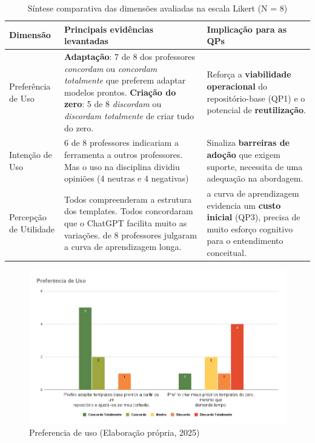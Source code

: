 \begin{table}[H]
    \centering
    \caption{Síntese comparativa das dimensões avaliadas na escala Likert (N = 8)}
    \label{tab:dimensoes-likert}
    \begin{tabular}{|p{} |p{} |p{}|}
        \hline
        \textbf{Dimensão} & \textbf{Principais evidências levantadas} & \textbf{Implicação para as QPs}\\ \hline
        Preferência de Uso &
             \textbf{Adaptação}: 7 de 8 dos professores \textit{concordam} ou \textit{concordam totalmente} que preferem adaptar modelos prontos. \newline%
             \textbf{Criação do zero}: 5 de 8 \textit{discordam} ou \textit{discordam totalmente} de criar tudo do zero.%
         &
        Reforça a \textbf{viabilidade operacional} do repositório-base (QP1) e o potencial de \textbf{reutilização}. \\ \hline
        Intenção de Uso &
            6 de 8 professores indicariam a ferramenta a outros professores. Mas o uso na disciplina dividiu opiniões (4 neutras e 4 negativas)%
        \ &
        Sinaliza \textbf{barreiras de adoção} que exigem suporte, necessita de uma adequação na abordagem. \\ \hline
        
        Percepção de Utilidade &
            Todos compreenderam a estrutura dos templates.\newline%
            Todos concordaram que o ChatGPT facilita muito as variações.\newline%
            4 de 8 professores julgaram a curva de aprendizagem longa.%
         &
        a curva de aprendizagem evidencia um \textbf{custo inicial} (QP3), precisa de muito esforço cognitivo para o entendimento conceitual. \\ \hline
    \end{tabular}
\end{table}



\begin{figure}[ht]
	\centering
	\includegraphics[width=16cm]{./imagens/capitulo8/preferencia-uso}
	\caption{Preferencia de uso  (Elaboração própria, 2025) }
	\label{fig:preferencia-uso}
\end{figure}


